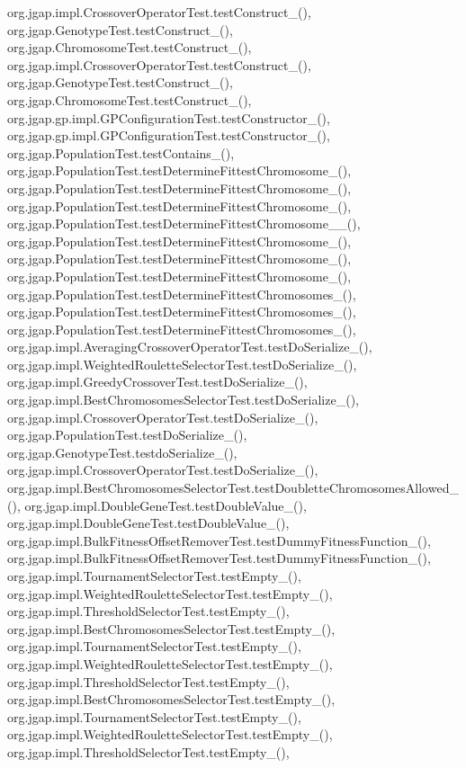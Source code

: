 org.\-jgap.\-impl.\-Crossover\-Operator\-Test.\-test\-Construct\-\_(), org.\-jgap.\-Genotype\-Test.\-test\-Construct\-\_(), org.\-jgap.\-Chromosome\-Test.\-test\-Construct\-\_(), org.\-jgap.\-impl.\-Crossover\-Operator\-Test.\-test\-Construct\-\_(), org.\-jgap.\-Genotype\-Test.\-test\-Construct\-\_(), org.\-jgap.\-Chromosome\-Test.\-test\-Construct\-\_(), org.\-jgap.\-gp.\-impl.\-G\-P\-Configuration\-Test.\-test\-Constructor\-\_(), org.\-jgap.\-gp.\-impl.\-G\-P\-Configuration\-Test.\-test\-Constructor\-\_(), org.\-jgap.\-Population\-Test.\-test\-Contains\-\_(), org.\-jgap.\-Population\-Test.\-test\-Determine\-Fittest\-Chromosome\-\_(), org.\-jgap.\-Population\-Test.\-test\-Determine\-Fittest\-Chromosome\-\_(), org.\-jgap.\-Population\-Test.\-test\-Determine\-Fittest\-Chromosome\-\_(), org.\-jgap.\-Population\-Test.\-test\-Determine\-Fittest\-Chromosome\-\_\-\_(), org.\-jgap.\-Population\-Test.\-test\-Determine\-Fittest\-Chromosome\-\_(), org.\-jgap.\-Population\-Test.\-test\-Determine\-Fittest\-Chromosome\-\_(), org.\-jgap.\-Population\-Test.\-test\-Determine\-Fittest\-Chromosome\-\_(), org.\-jgap.\-Population\-Test.\-test\-Determine\-Fittest\-Chromosomes\-\_(), org.\-jgap.\-Population\-Test.\-test\-Determine\-Fittest\-Chromosomes\-\_(), org.\-jgap.\-Population\-Test.\-test\-Determine\-Fittest\-Chromosomes\-\_(), org.\-jgap.\-impl.\-Averaging\-Crossover\-Operator\-Test.\-test\-Do\-Serialize\-\_(), org.\-jgap.\-impl.\-Weighted\-Roulette\-Selector\-Test.\-test\-Do\-Serialize\-\_(), org.\-jgap.\-impl.\-Greedy\-Crossover\-Test.\-test\-Do\-Serialize\-\_(), org.\-jgap.\-impl.\-Best\-Chromosomes\-Selector\-Test.\-test\-Do\-Serialize\-\_(), org.\-jgap.\-impl.\-Crossover\-Operator\-Test.\-test\-Do\-Serialize\-\_(), org.\-jgap.\-Population\-Test.\-test\-Do\-Serialize\-\_(), org.\-jgap.\-Genotype\-Test.\-testdo\-Serialize\-\_(), org.\-jgap.\-impl.\-Crossover\-Operator\-Test.\-test\-Do\-Serialize\-\_(), org.\-jgap.\-impl.\-Best\-Chromosomes\-Selector\-Test.\-test\-Doublette\-Chromosomes\-Allowed\-\_(), org.\-jgap.\-impl.\-Double\-Gene\-Test.\-test\-Double\-Value\-\_(), org.\-jgap.\-impl.\-Double\-Gene\-Test.\-test\-Double\-Value\-\_(), org.\-jgap.\-impl.\-Bulk\-Fitness\-Offset\-Remover\-Test.\-test\-Dummy\-Fitness\-Function\-\_(), org.\-jgap.\-impl.\-Bulk\-Fitness\-Offset\-Remover\-Test.\-test\-Dummy\-Fitness\-Function\-\_(), org.\-jgap.\-impl.\-Tournament\-Selector\-Test.\-test\-Empty\-\_(), org.\-jgap.\-impl.\-Weighted\-Roulette\-Selector\-Test.\-test\-Empty\-\_(), org.\-jgap.\-impl.\-Threshold\-Selector\-Test.\-test\-Empty\-\_(), org.\-jgap.\-impl.\-Best\-Chromosomes\-Selector\-Test.\-test\-Empty\-\_(), org.\-jgap.\-impl.\-Tournament\-Selector\-Test.\-test\-Empty\-\_(), org.\-jgap.\-impl.\-Weighted\-Roulette\-Selector\-Test.\-test\-Empty\-\_(), org.\-jgap.\-impl.\-Threshold\-Selector\-Test.\-test\-Empty\-\_(), org.\-jgap.\-impl.\-Best\-Chromosomes\-Selector\-Test.\-test\-Empty\-\_(), org.\-jgap.\-impl.\-Tournament\-Selector\-Test.\-test\-Empty\-\_(), org.\-jgap.\-impl.\-Weighted\-Roulette\-Selector\-Test.\-test\-Empty\-\_(), org.\-jgap.\-impl.\-Threshold\-Selector\-Test.\-test\-Empty\-\_(), 